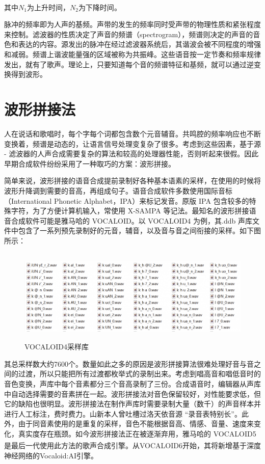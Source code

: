 \documentclass[12pt,a4paper]{ctexart}
\newcommand{\supercite}[1]{\textsuperscript{\cite{#1}}}
\begin{document}
其中$N_1$为上升时间，$N_2$为下降时间\supercite{4}。

脉冲的频率即为人声的基频。声带的发生的频率同时受声带的物理性质和紧张程度来控制。滤波器的性质决定了声音的频谱（spectrogram），频谱则决定的声音的音色和表达的内容。源发出的脉冲在经过滤波器系统后，其谐波会被不同程度的增强和减弱。频谱上谐波能量强的区域被称为共振峰。这些语音按一定节奏和频率规律发出，就有了歌声。理论上，只要知道每个音的频谱特征和基频，就可以通过逆变换得到波形。
\section{波形拼接法}
人在说话和歌唱时，每个字每个词都包含数个元音辅音。共鸣腔的频率响应也不断变换着，频谱是动态的，让语言信号处理变复杂了很多。考虑到这些因素，基于源 - 滤波器的人声合成需要复杂的算法和较高的处理器性能，否则听起来很假。因此早期合成软件纷纷采用了一种取巧的方案：波形拼接。

简单来说，波形拼接的语音合成提前录制好各种基本语素的采样，在使用的时候将波形升降调到需要的音高，再组成句子。语音合成软件多数使用国际音标（International Phonetic Alphabet，IPA）来标记发音。原版 IPA 包含较多的特殊字符，为了方便计算机输入，常使用 X-SAMPA 等记法。最知名的波形拼接语音合成软件可能是雅马哈的 VOCALOID。以 VOCALOID4 为例，其.ddb 声库文件中包含了一系列预先录制好的元音，辅音，以及音与音之间衔接的采样。如下图所示：
\begin{figure}[H]
    \centering
    \includegraphics[height=4.5cm]{figure1.png}
    \caption{VOCALOID4采样库}
\end{figure}
其总采样数大约7600个。数量如此之多的原因是波形拼接算法很难处理好音与音之间的过渡，所以只能把所有过渡都枚举式的录制出来。考虑到唱高音和唱低音时的音色变换，声库中每个音素都分三个音高录制了三份。合成语音时，编辑器从声库中自动选择需要的音素拼在一起。波形拼接法对音色保留较好，对性能要求低，但它的缺陷也很明显。波形拼接法在制作声库时需要录制大量（数千）的声音样本并进行人工标注，费时费力。山新本人曾吐槽过洛天依音源 “录音表特别长”。此外，由于同音素使用的是重复的采样，音色不能根据音高、情感、音量、速度来变化，真实度存在瓶颈。如今波形拼接法正在被逐渐弃用，雅马哈的 VOCALOID5 是最后一代使用此方法的歌声合成引擎\supercite{5}。从VOCALOID6开始，其将新增基于深度神经网络的Vocaloid:AI引擎。
\end{document}
